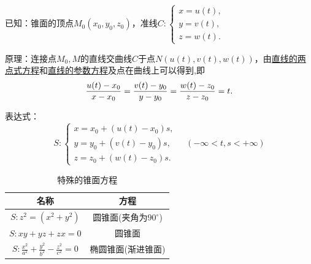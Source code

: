 \theorem[锥面的参数方程]

\par {\color{dy}已知}：锥面的顶点$M_0(x_0,y_0,z_0)$，准线$C:
\begin{cases}
x=u(t),\\
y=v(t),\\
z=w(t).
\end{cases}$
\par {\color{dy}原理}：连接点$M_0,M$的直线交曲线$C$于点$N(u(t),v(t),w(t))$，由\hyperref[两点式方程]{\color{超链接}直线的两点式方程}和\hyperref[直线的参数方程]{\color{超链接}直线的参数方程}及点在曲线上可以得到,即
\begin{equation*}
\displaystyle \frac{u(t)-x_0}{x-x_0}=\frac{v(t)-y_0}{y-y_0}=\frac{w(t)-z_0}{z-z_0}=t.\\
\end{equation*}
\par {\color{dy}表达式}：
\begin{equation}
S:
\begin{cases}
x=x_0+(u(t)-x_0)s,\\
y=y_0+(v(t)-y_0)s,\\
z=z_0+(w(t)-z_0)s.
\end{cases}
\quad (-\infty <t,s<+\infty )
\end{equation}

\example[特殊的锥面方程]
\begin{table}[h]
\begin{center}
\begin{tabular}{|c|c|}
	\hline
	名称 &方程 \\
	\hline
	  \hspace*{1em} $S:z^2=(x^2+y^2)$ \hspace*{1em} & 圆锥面(夹角为$90^{\circ}$)  \\
	\hline
\hspace*{1em} $S:xy+yz+zx=0$ \hspace*{1em}   & 圆锥面 \\
	\hline
\multirow{2}{*}{\hspace*{1em} $\displaystyle S:\frac{x^2}{a^2}+\frac{y^2}{b^2}-\frac{z^2}{c^2}=0$ \hspace*{1em}}  &\multirow{2}{*}{椭圆锥面(渐进锥面)}   \\
	& \\
	\hline
\end{tabular}
	\caption{特殊的锥面方程}
	\label{特殊的锥面方程}
\end{center}
\end{table}
\sj
